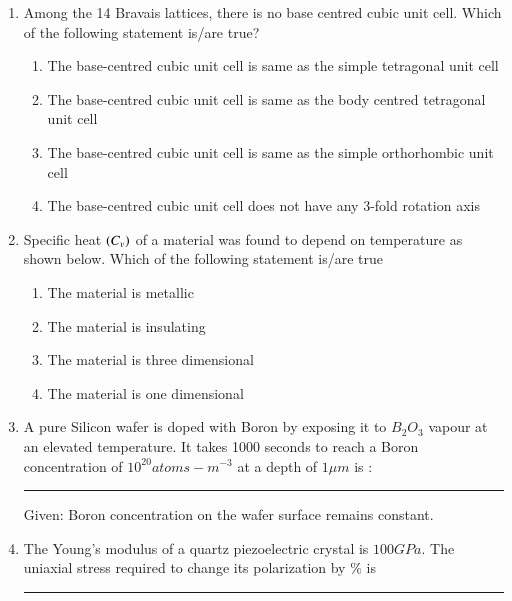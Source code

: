 \documentclass[journal]{IEEEtran}
\numberwithin{equation}{enumi}
\numberwithin{figure}{enumi}
\begin{document}
\begin{enumerate}
	\item Among the 14 Bravais lattices, there is no base centred cubic unit cell. Which of the following statement is/are true?
		
		\hfill{}

		\begin{enumerate}
			\item The base-centred cubic unit cell is same as the simple tetragonal unit cell
			\item The base-centred cubic unit cell is same as the body centred tetragonal unit cell
			\item The base-centred cubic unit cell is same as the simple orthorhombic unit cell
			\item The base-centred cubic unit cell does not have any 3-fold rotation axis
		\end{enumerate}

	\item Specific heat $\left(C_v\right)$ of a material was found to depend on temperature as shown below. Which of the following statement is/are true 

		\begin{figure}[H]
			\centering
			\resizebox{0.6\textwidth}{!}{}
		\end{figure}

		\hfill{}

		\begin{enumerate}
			\item The material is metallic
			\item The material is insulating
			\item The material is three dimensional
			\item The material is one dimensional
		\end{enumerate}

	\item A pure Silicon wafer is doped with Boron by exposing it to $B_2O_3$ vapour at an elevated temperature. It takes 1000 seconds to reach a Boron concentration of $10^{20} atoms-m^{-3}$ at a depth of $1\mu m$ is :\rule{1cm}{0.1pt} 

		Given: Boron concentration on the wafer surface remains constant.

		\hfill{}

	\item The Young's modulus of a quartz piezoelectric crystal is $100GPa$. The uniaxial stress required to change its polarization by $\%$ is \rule{1cm}{0.1pt}  


\end{enumerate}
\end{document}
